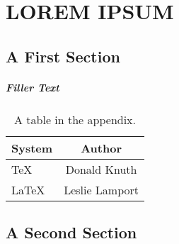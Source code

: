 \chapter{LOREM IPSUM}

\section{A First Section}

\paragraph{Filler Text} \lipsum[1-6]
%
%
\lipsum[7-10]
\begin{table}
  \caption{A table in the appendix.}
  \label{tab:app}
  \begin{center}
    \begin{tabular}{lc}
      \toprule
      System & Author \\
      \midrule
      \TeX   & Donald Knuth   \\
      \LaTeX & Leslie Lamport \\
      \bottomrule
    \end{tabular}
  \end{center}
\end{table}
%

\section{A Second Section}

\lipsum[14-15]
